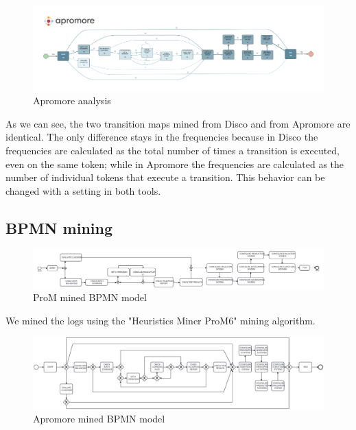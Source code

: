 \begin{figure}[H]
\centering
\includegraphics[width=\textwidth]{figures/apromore_map.pdf}
\caption{Apromore analysis}
\label{fig:apromore_analysis}
\end{figure}

As we can see, the two transition maps mined from Disco and from 
Apromore are identical. The only difference stays in the frequencies
because in Disco the frequencies are calculated as the total number of
times a transition is executed, even on the same token; while in Apromore
the frequencies are calculated as the number of individual tokens that execute a
transition. This behavior can be changed with a setting in both tools.

\subsection{BPMN mining}

\begin{figure}[H]
\centering
\includegraphics[width=\textwidth]{figures/prom_mined.pdf}
\caption{ProM mined BPMN model}
\label{fig:prom_mined}
\end{figure}

We mined the logs using the "Heuristics Miner ProM6" mining algorithm.

\begin{figure}[H]
\centering
\includegraphics[width=\textwidth]{figures/apromore_mined.pdf}
\caption{Apromore mined BPMN model}
\label{fig:apromore_mined}
\end{figure}

